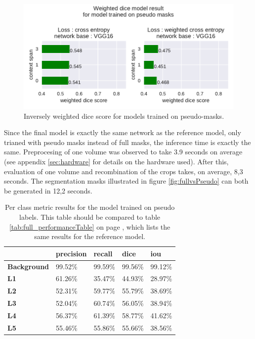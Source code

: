 \begin{figure}
        \includegraphics[width=.99\textwidth]{images/PseudoSupervised.pdf}
        \caption{Inversely weighted dice score for models trained on pseudo-masks. \label{fig:PseudoSupervised_dice}}
        
\end{figure}

\par{
    Since the final model is exactly the same network as the reference model, only trianed with pseudo masks instead of full masks, the inference time is exactly the same.
Preprocesing of one volume was observed to take 3.9 seconds on average (see appendix \ref{sec:hardware} for details on the hardware used).
After this, evaluation of one volume and recombination of the crops takes, on average, 8,3 seconds.
The segmentation masks illustrated in figure \ref{fig:fullvsPseudo} can both be generated in 12,2 seconds.
}

\begin{table}
    \begin{tabular}{l|llll}
        \toprule
                            & \textbf{precision} & \textbf{recall} & \textbf{dice} & \textbf{iou} \\ \hline
\textbf{Background} & 99.52\%            & 99.59\%         & 99.56\%       & 99.12\%      \\
\textbf{L1}         & 61.26\%            & 35.47\%         & 44.93\%       & 28.97\%      \\
\textbf{L2}         & 52.31\%            & 59.77\%         & 55.79\%       & 38.69\%      \\
\textbf{L3}         & 52.04\%            & 60.74\%         & 56.05\%       & 38.94\%      \\
\textbf{L4}         & 56.37\%            & 61.39\%         & 58.77\%       & 41.62\%      \\
\textbf{L5}         & 55.46\%            & 55.86\%         & 55.66\%       & 38.56\%       \\
        \bottomrule
        \end{tabular}
    
        \caption{Per class metric results for the model trained on pseudo labels. 
        This table should be compared to table \ref{tab:full_performanceTable} on page \pageref{tab:full_performanceTable}, which lists the same results for the reference model.
        }
    \end{table}

